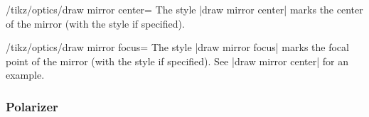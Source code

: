 \documentclass[a4paper]{ltxdoc}
\begin{document}
\begin{stylekey}{/tikz/optics/draw mirror center=}
    The style |draw mirror center| marks the center of the mirror (with the style  if specified).

\begin{codeexample}[width=5cm]
\end{codeexample}
\end{stylekey}

\begin{stylekey}{/tikz/optics/draw mirror focus=}
    The style |draw mirror focus| marks the focal point of the mirror (with the style  if specified).
    See |draw mirror center| for an example.
\end{stylekey}

\subsubsection{Polarizer}
\end{document}
